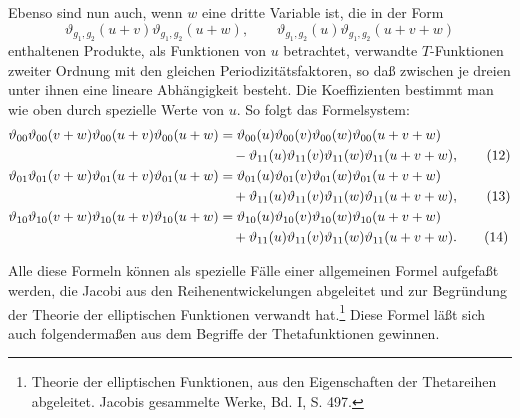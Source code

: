 \documentclass[11pt]{article}
\providecommand{\tht}{\vartheta}
\begin{document}
Ebenso sind nun auch, wenn $w$ eine dritte Variable ist, die in der Form
\[
\tht_{g_1,g_2}(u+v)\tht_{g_1,g_2}(u+w),\qquad
\tht_{g_1,g_2}(u)\tht_{g_1,g_2}(u+v+w)
\]
enthaltenen Produkte, als Funktionen von $u$ betrachtet, verwandte $T$-Funktionen zweiter Ordnung mit den gleichen Periodizitätsfaktoren, so daß zwischen je dreien unter ihnen eine lineare Abhängigkeit besteht. Die Koeffizienten bestimmt man wie oben durch spezielle Werte von $u$. So folgt das Formelsystem:
\begin{align}
\tht_{00}\tht_{00}(v+w)\tht_{00}(u+v)\tht_{00}(u+w)
&=\tht_{00}(u)\tht_{00}(v)\tht_{00}(w)\tht_{00}(u+v+w) \notag\\
&\quad -\tht_{11}(u)\tht_{11}(v)\tht_{11}(w)\tht_{11}(u+v+w), \tag{12}\\
\tht_{01}\tht_{01}(v+w)\tht_{01}(u+v)\tht_{01}(u+w)
&=\tht_{01}(u)\tht_{01}(v)\tht_{01}(w)\tht_{01}(u+v+w) \notag\\
&\quad +\tht_{11}(u)\tht_{11}(v)\tht_{11}(w)\tht_{11}(u+v+w), \tag{13}\\
\tht_{10}\tht_{10}(v+w)\tht_{10}(u+v)\tht_{10}(u+w)
&=\tht_{10}(u)\tht_{10}(v)\tht_{10}(w)\tht_{10}(u+v+w) \notag\\
&\quad +\tht_{11}(u)\tht_{11}(v)\tht_{11}(w)\tht_{11}(u+v+w). \tag{14}
\end{align}

Alle diese Formeln können als spezielle Fälle einer allgemeinen Formel aufgefaßt werden, die Jacobi aus den Reihenentwickelungen abgeleitet und zur Begründung der Theorie der elliptischen Funktionen verwandt hat.\footnote{Theorie der elliptischen Funktionen, aus den Eigenschaften der Thetareihen abgeleitet. Jacobis gesammelte Werke, Bd. I, S. 497.} Diese Formel läßt sich auch folgendermaßen aus dem Begriffe der Thetafunktionen gewinnen.
\end{document}
